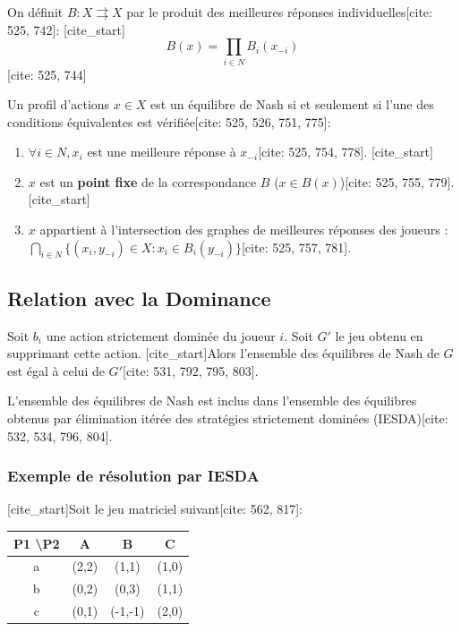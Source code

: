 \begin{definition}On définit $B : X \rightrightarrows X$ par le produit des meilleures réponses individuelles[cite: 525, 742]:
[cite_start]$$B(x) = \prod_{i \in N} B_i(x_{-i})$$ [cite: 525, 744]
\end{definition}

\begin{theorem}Un profil d'actions $x \in X$ est un équilibre de Nash si et seulement si l'une des conditions équivalentes est vérifiée[cite: 525, 526, 751, 775]:
\begin{enumerate}
    \item $\forall i \in N, x_i$ est une meilleure réponse à $x_{-i}$[cite: 525, 754, 778].
    [cite_start]\item $x$ est un \textbf{point fixe} de la correspondance $B$ ($x \in B(x)$)[cite: 525, 755, 779].
    [cite_start]\item $x$ appartient à l'intersection des graphes de meilleures réponses des joueurs : $\bigcap_{i \in N} \{ (x_i, y_{-i}) \in X : x_i \in B_i(y_{-i}) \}$[cite: 525, 757, 781].
\end{enumerate}
\end{theorem}

\subsection{Relation avec la Dominance}

\begin{proposition}
Soit $b_i$ une action strictement dominée du joueur $i$. Soit $G'$ le jeu obtenu en supprimant cette action. [cite_start]Alors l'ensemble des équilibres de Nash de $G$ est égal à celui de $G'$[cite: 531, 792, 795, 803].
\end{proposition}

\begin{corollary}
L'ensemble des équilibres de Nash est inclus dans l'ensemble des équilibres obtenus par élimination itérée des stratégies strictement dominées (IESDA)[cite: 532, 534, 796, 804].
\end{corollary}

\subsubsection{Exemple de résolution par IESDA}

[cite_start]Soit le jeu matriciel suivant[cite: 562, 817]:
\begin{center}
\begin{tabular}{c|c|c|c}
P1 \textbackslash P2 & A & B & C \\ \hline
a & (2,2) & (1,1) & (1,0) \\ \hline
b & (0,2) & (0,3) & (1,1) \\ \hline
c & (0,1) & (-1,-1) & (2,0)
\end{tabular}
\end{center}

